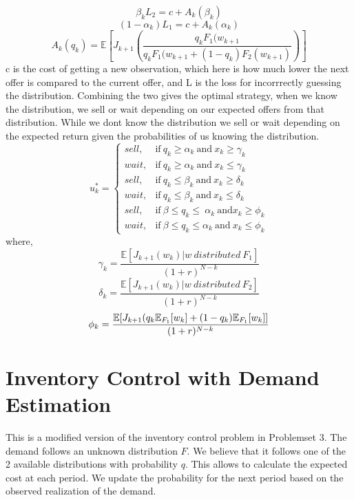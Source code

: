 \documentclass[11pt, oneside]{article}   	%
\begin{document}
$$\beta_{k}L_{2}=c+A_{k}(\beta_{k})$$
$$(1-\alpha_{k})L_{1}=c+A_{k}(\alpha_{k})$$
$$A_{k}(q_{k})=\mathbb{E}[J_{k+1}(\frac{q_{k}F_{1}(w_{k+1}}{q_{k}F_{1}(w_{k+1} + (1-q_{k})F_{2}(w_{k+1})})]$$
c is the cost of getting a new observation, which here is how much lower the next offer is compared to the current offer, and L is the loss for incorrrectly guessing the distribution.
Combining the two gives the optimal strategy, when we know the distribution, we sell or wait depending on our expected offers from that distribution. While we dont know the distribution we sell or wait depending on the expected return given the probabilities of us knowing the distribution.
\begin{equation}
    u^{*}_{k}=
    \begin{cases}
      sell, & \text{if}\ q_{k} \geq \alpha_{k} ~\text{and}~ x_{k} \geq \gamma_{k}\\
      wait, & \text{if}\ q_{k} \geq \alpha_{k}~ \text{and} ~x_{k} \leq \gamma_{k}\\
      sell, & \text{if}\ q_{k} \leq \beta_{k} ~\text{and}~ x_{k} \geq \delta_{k}\\
      wait, & \text{if}\ q_{k} \leq \beta_{k}~ \text{and} ~x_{k} \leq \delta_{k}\\
      sell, & \text{if}\ \beta \leq q_{k} \leq ~\alpha_{k}~ \text{and} x_{k} \geq \phi_{k}  \\
      wait, & \text{if}\ \beta \leq q_{k} \leq \alpha_{k}~ \text{and} ~x_{k} \leq \phi_{k}
    \end{cases}
  \end{equation}
where,
$$
\gamma_{k} = \frac{\mathbb{E}[J_{k+1}(w_{k})| w ~distributed~ F_{1}]}{(1+r)^{N-k}} $$
$$
\delta_{k} = \frac{\mathbb{E}[J_{k+1}(w_{k})| w~distributed~  F_{2}]}{(1+r)^{N-k}} $$
$$
\phi_{k} = \frac{\mathbb{E}[J_{k+1}(q_{k}\mathbb{E}_{F_{1}}[w_{k}]+(1-q_{k})\mathbb{E}_{F_{1}}[w_{k}]]}{(1+r)^{N-k}} \\
$$


\section{Inventory Control with Demand Estimation}

This is a modified version of the inventory control problem in Problemset 3. The demand follows an unknown distribution $F$. We believe that it follows one of the 2 available distributions with probability $q$. This allows to calculate the expected cost at each period. We update the probability for the next period based on the observed realization of the demand.\\
\end{document}
